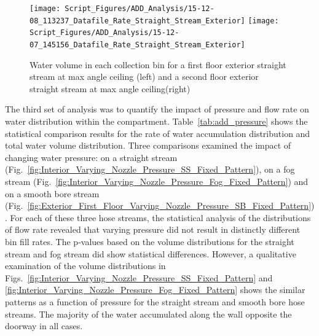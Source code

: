\documentclass{book}
\begin{document}
\begin{figure}[ht]
\texttt{[image: Script\_Figures/ADD\_Analysis/15-12-08\_113237\_Datafile\_Rate\_Straight\_Stream\_Exterior]}
\texttt{[image: Script\_Figures/ADD\_Analysis/15-12-07\_145156\_Datafile\_Rate\_Straight\_Stream\_Exterior]} \\ 
\caption{Water volume in each collection bin for a first floor exterior straight stream at max angle ceiling (left) and a second floor exterior straight stream at max angle ceiling(right)}
\label{fig:Exterior_First_Floor_Second_Floor}
\end{figure}

\clearpage

The third set of analysis was to quantify the impact of pressure and flow rate on water distribution within the compartment. Table~\ref{tab:add_pressure} shows the statistical comparison results for the rate of water accumulation distribution and total water volume distribution. Three comparisons examined the impact of changing water pressure: on a straight stream (Fig.~\ref{fig:Interior_Varying_Nozzle_Pressure_SS_Fixed_Pattern}), on a fog stream (Fig.~\ref{fig:Interior_Varying_Nozzle_Pressure_Fog_Fixed_Pattern}) and on a smooth bore stream (Fig.~\ref{fig:Exterior_First_Floor_Varying_Nozzle_Pressure_SB_Fixed_Pattern}). For each of these three hose streams, the statistical analysis of the distributions of flow rate revealed that varying pressure did not result in distinctly different bin fill rates. The p-values based on the volume distributions for the straight stream and fog stream did show statistical differences. However, a qualitative examination of the volume distributions in Figs.~\ref{fig:Interior_Varying_Nozzle_Pressure_SS_Fixed_Pattern} and \ref{fig:Interior_Varying_Nozzle_Pressure_Fog_Fixed_Pattern} shows the similar patterns as a function of pressure for the straight stream and smooth bore hose streams. The majority of the water accumulated along the wall opposite the doorway in all cases.
\end{document}
